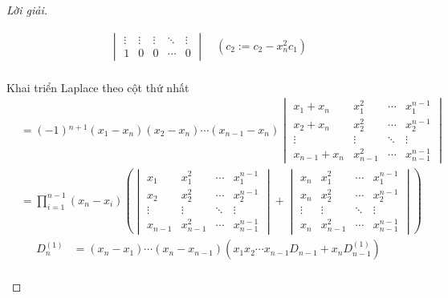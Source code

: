 \documentclass[class=linear-algebra,crop=false]{standalone}
\begin{document}
\begin{proof}[Lời giải]
\begin{enumerate}[label = (\alph*)]
\begin{align*}
\begin{vmatrix}
				      \vdots & \vdots                         & \vdots                   & \ddots & \vdots                     \\
				      1      & 0                              & 0                        & \cdots & 0
			      \end{vmatrix}\quad(c_{2}:=c_{2} - x_{n}^{2}c_{1}) \\
		      \end{align*}
		      \par Khai triển Laplace theo cột thứ nhất
		      \begin{align*}
			       & = (-1){}^{n+1}(x_{1} - x_{n})(x_{2} - x_{n})\cdots (x_{n-1} - x_{n})
			      \begin{vmatrix}
				      x_{1} + x_{n}   & x_{1}^{2}   & \cdots & x_{1}^{n-1}   \\
				      x_{2} + x_{n}   & x_{2}^{2}   & \cdots & x_{2}^{n-1}   \\
				      \vdots          & \vdots      & \ddots & \vdots        \\
				      x_{n-1} + x_{n} & x_{n-1}^{2} & \cdots & x_{n-1}^{n-1}
			      \end{vmatrix}                  \\
			       & = \prod^{n-1}_{i=1}(x_{n} - x_{i})\left(
			      \begin{vmatrix}
					      x_{1}   & x_{1}^{2}   & \cdots & x_{1}^{n-1}   \\
					      x_{2}   & x_{2}^{2}   & \cdots & x_{2}^{n-1}   \\
					      \vdots  & \vdots      & \ddots & \vdots        \\
					      x_{n-1} & x_{n-1}^{2} & \cdots & x_{n-1}^{n-1}
				      \end{vmatrix}
			      +
			      \begin{vmatrix}
					      x_{n}  & x_{1}^{2}   & \cdots & x_{1}^{n-1}   \\
					      x_{n}  & x_{2}^{2}   & \cdots & x_{2}^{n-1}   \\
					      \vdots & \vdots      & \ddots & \vdots        \\
					      x_{n}  & x_{n-1}^{2} & \cdots & x_{n-1}^{n-1}
				      \end{vmatrix}
			      \right)
		      \end{align*}
		      \begingroup{}
		      \allowdisplaybreaks{}
		      \begin{align*}
			      D^{(1)}_{n} & = (x_{n} - x_{1})\cdots(x_{n} - x_{n-1})\left( x_{1}x_{2}\cdots x_{n-1} D_{n-1} + x_{n}D^{(1)}_{n-1}\right)                                                                                        \\

\end{align*}
\end{enumerate}
\end{proof}
\end{document}
